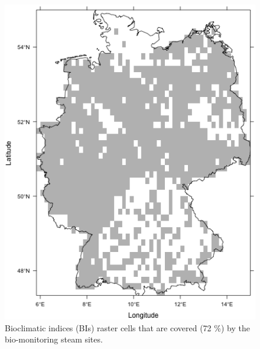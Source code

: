 \clearpage

\begin{figure}[hp!]
  \centering
  \includegraphics[width=\textwidth]{Figures/Fig_C_4.png}
  \caption{Bioclimatic indices (BIs) raster cells that are covered (72 \%) by the bio-monitoring steam sites.}
  \label{Fig_C_4}
\end{figure}

\clearpage

